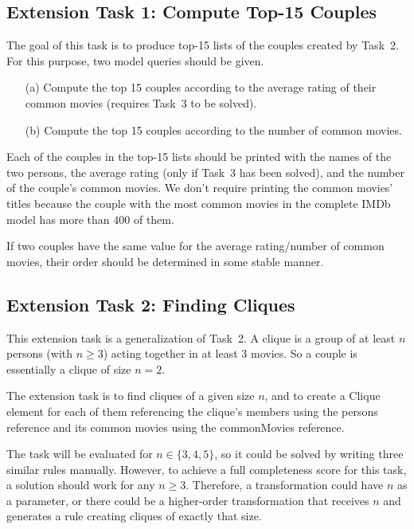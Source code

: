 \documentclass[a4paper,11pt]{article}
\newcommand{\p}[1]{\textsf{\small #1}}
\begin{document}
\subsection{Extension Task 1: Compute Top-15 Couples}

The goal of this task is to produce top-15 lists of the couples created by
Task~2.  For this purpose, two model queries should be given.

\begin{enumerate}
\item[(a)] Compute the top 15 couples according to the average rating of
  their common movies (requires Task~3 to be solved).
\item[(b)] Compute the top 15 couples according to the number of common movies.
\end{enumerate}

Each of the couples in the top-15 lists should be printed with the names of the
two persons, the average rating (only if Task~3 has been solved), and the
number of the couple's common movies.  We don't require printing the common
movies' titles because the couple with the most common movies in the complete
IMDb model has more than 400 of them.

If two couples have the same value for the average rating/number of common
movies, their order should be determined in some stable manner.

\subsection{Extension Task 2: Finding Cliques}

This extension task is a generalization of Task~2.  A clique is a group of at
least \(n\) persons (with \(n \geq 3\)) acting together in at least 3 movies.
So a couple is essentially a clique of size \(n = 2\).

The extension task is to find cliques of a given size \(n\), and to create a
\p{Clique} element for each of them referencing the clique's members using the
\p{persons} reference and its common movies using the \p{commonMovies}
reference.

The task will be evaluated for \(n \in \{3, 4, 5\}\), so it could be solved by
writing three similar rules manually.  However, to achieve a full completeness
score for this task, a solution should work for any \(n \geq 3\).  Therefore, a
transformation could have \(n\) as a parameter, or there could be a
higher-order transformation that receives \(n\) and generates a rule creating
cliques of exactly that size.
\end{document}
